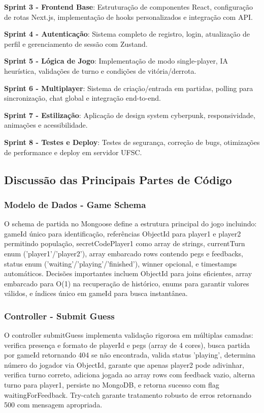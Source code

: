 \documentclass[conference]{IEEEtran}
\begin{document}
\textbf{Sprint 3 - Frontend Base}: Estruturação de componentes React, configuração de rotas Next.js, implementação de hooks personalizados e integração com API.

\textbf{Sprint 4 - Autenticação}: Sistema completo de registro, login, atualização de perfil e gerenciamento de sessão com Zustand.

\textbf{Sprint 5 - Lógica de Jogo}: Implementação de modo single-player, IA heurística, validações de turno e condições de vitória/derrota.

\textbf{Sprint 6 - Multiplayer}: Sistema de criação/entrada em partidas, polling para sincronização, chat global e integração end-to-end.

\textbf{Sprint 7 - Estilização}: Aplicação de design system cyberpunk, responsividade, animações e acessibilidade.

\textbf{Sprint 8 - Testes e Deploy}: Testes de segurança, correção de bugs, otimizações de performance e deploy em servidor UFSC.

\subsection{Discussão das Principais Partes de Código}

\subsubsection{Modelo de Dados - Game Schema}

O schema de partida no Mongoose define a estrutura principal do jogo incluindo: gameId único para identificação, referências ObjectId para player1 e player2 permitindo população, secretCodePlayer1 como array de strings, currentTurn enum ('player1'/'player2'), array embarcado rows contendo pegs e feedbacks, status enum ('waiting'/'playing'/'finished'), winner opcional, e timestamps automáticos. Decisões importantes incluem ObjectId para joins eficientes, array embarcado para O(1) na recuperação de histórico, enums para garantir valores válidos, e índices único em gameId para busca instantânea.

\subsubsection{Controller - Submit Guess}

O controller submitGuess implementa validação rigorosa em múltiplas camadas: verifica presença e formato de playerId e pegs (array de 4 cores), busca partida por gameId retornando 404 se não encontrada, valida status 'playing', determina número do jogador via ObjectId, garante que apenas player2 pode adivinhar, verifica turno correto, adiciona jogada ao array rows com feedback vazio, alterna turno para player1, persiste no MongoDB, e retorna sucesso com flag waitingForFeedback. Try-catch garante tratamento robusto de erros retornando 500 com mensagem apropriada.
\end{document}
